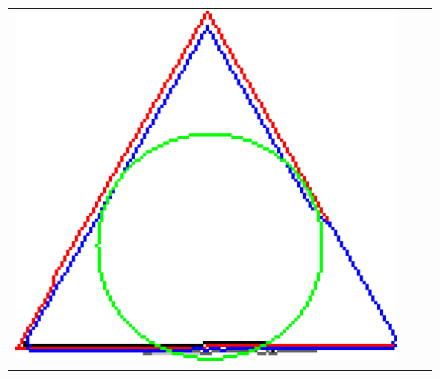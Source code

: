 \begin{figure}
\begin{tabular}{ccc}
\includegraphics[scale=0.25]{figures/chapter5/flow/triangle/radius_3/mdca/elastica/len_pen_0.01000/jonctions_1/best/gs_0.25000/summary.pdf}\\[2em]


\end{tabular}
\end{figure}
